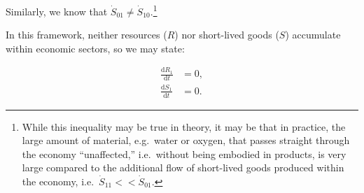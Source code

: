 Similarly, we know that
$\dot{S}_{01} \neq \dot{S}_{10}$.\footnote{While
this inequality may be true in theory,
it may be that in practice,
the large amount of material,
e.g.\ water or oxygen,
that passes straight through the economy ``unaffected,''
i.e.\ without being embodied in products,
is very large compared to the additional flow of short-lived goods
produced within the economy,
i.e.\ $\dot{S}_{11} << \dot{S}_{01}$.
}
%


In this framework, neither resources ($R$) 
nor short-lived goods ($S$) accumulate 
within economic sectors, 
so we may state:

\begin{align}\label{eq:A-dS_1/dt_zero}
	\frac{\mathrm{d}R_1}{\mathrm{d}t}				&
	= 0,																	\\
	\frac{\mathrm{d}S_1}{\mathrm{d}t}				&
	= 0.
\end{align}




